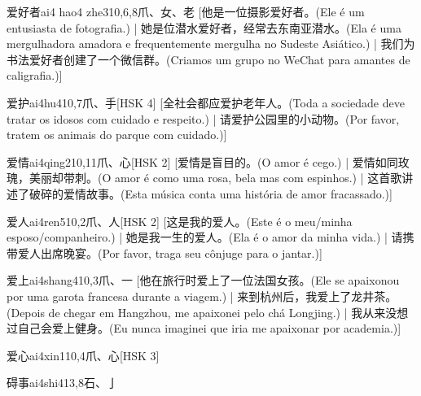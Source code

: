 \begin{entry}{爱好者}{ai4 hao4 zhe3}{10,6,8}{⽖、⼥、⽼}
  [他是一位摄影爱好者。(Ele é um entusiasta de fotografia.) | 她是位潜水爱好者，经常去东南亚潜水。(Ela é uma mergulhadora amadora e frequentemente mergulha no Sudeste Asiático.)  | 我们为书法爱好者创建了一个微信群。(Criamos um grupo no WeChat para amantes de caligrafia.)]
\end{entry}

\begin{entry}{爱护}{ai4hu4}{10,7}{⽖、⼿}[HSK 4]
  [全社会都应爱护老年人。(Toda a sociedade deve tratar os idosos com cuidado e respeito.) | 请爱护公园里的小动物。(Por favor, tratem os animais do parque com cuidado.)]
\end{entry}

\begin{entry}{爱情}{ai4qing2}{10,11}{⽖、⼼}[HSK 2]
  [爱情是盲目的。(O amor é cego.) | 爱情如同玫瑰，美丽却带刺。(O amor é como uma rosa, bela mas com espinhos.)  | 这首歌讲述了破碎的爱情故事。(Esta música conta uma história de amor fracassado.)]
\end{entry}

\begin{entry}{爱人}{ai4ren5}{10,2}{⽖、⼈}[HSK 2]
  [这是我的爱人。(Este é o meu/minha esposo/companheiro.) | 她是我一生的爱人。(Ela é o amor da minha vida.) | 请携带爱人出席晚宴。(Por favor, traga seu cônjuge para o jantar.)]
\end{entry}

\begin{entry}{爱上}{ai4shang4}{10,3}{⽖、⼀}
  [他在旅行时爱上了一位法国女孩。(Ele se apaixonou por uma garota francesa durante a viagem.)  | 来到杭州后，我爱上了龙井茶。(Depois de chegar em Hangzhou, me apaixonei pelo chá Longjing.) | 我从来没想过自己会爱上健身。(Eu nunca imaginei que iria me apaixonar por academia.)]
\end{entry}

\begin{entry}{爱心}{ai4xin1}{10,4}{⽖、⼼}[HSK 3]
\end{entry}

\begin{entry}{碍事}{ai4shi4}{13,8}{⽯、⼅}
\end{entry}


